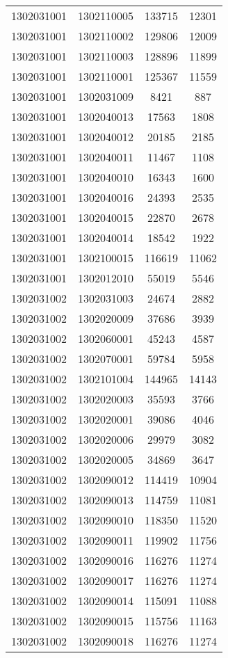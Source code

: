 \begin{longtable}{llcc}
1302031001 & 1302110005 & 133715 & 12301\\
1302031001 & 1302110002 & 129806 & 12009\\
1302031001 & 1302110003 & 128896 & 11899\\
1302031001 & 1302110001 & 125367 & 11559\\
1302031001 & 1302031009 & 8421 & 887\\
1302031001 & 1302040013 & 17563 & 1808\\
1302031001 & 1302040012 & 20185 & 2185\\
1302031001 & 1302040011 & 11467 & 1108\\
1302031001 & 1302040010 & 16343 & 1600\\
1302031001 & 1302040016 & 24393 & 2535\\
1302031001 & 1302040015 & 22870 & 2678\\
1302031001 & 1302040014 & 18542 & 1922\\
1302031001 & 1302100015 & 116619 & 11062\\
1302031001 & 1302012010 & 55019 & 5546\\
1302031002 & 1302031003 & 24674 & 2882\\
1302031002 & 1302020009 & 37686 & 3939\\
1302031002 & 1302060001 & 45243 & 4587\\
1302031002 & 1302070001 & 59784 & 5958\\
1302031002 & 1302101004 & 144965 & 14143\\
1302031002 & 1302020003 & 35593 & 3766\\
1302031002 & 1302020001 & 39086 & 4046\\
1302031002 & 1302020006 & 29979 & 3082\\
1302031002 & 1302020005 & 34869 & 3647\\
1302031002 & 1302090012 & 114419 & 10904\\
1302031002 & 1302090013 & 114759 & 11081\\
1302031002 & 1302090010 & 118350 & 11520\\
1302031002 & 1302090011 & 119902 & 11756\\
1302031002 & 1302090016 & 116276 & 11274\\
1302031002 & 1302090017 & 116276 & 11274\\
1302031002 & 1302090014 & 115091 & 11088\\
1302031002 & 1302090015 & 115756 & 11163\\
1302031002 & 1302090018 & 116276 & 11274\\

\end{longtable}
